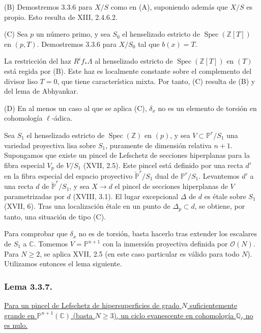\medskip
\noindent\textup{(B)}
Demostremos 3.3.6 para $X/S$ como en (A), suponiendo además que $X/S$
es propio. Esto resulta de XIII, 2.4.6.2.

\medskip
\noindent\textup{(C)}
Sea $p$ un número primo, y sea $S_0$ el henselizado estricto de
$\operatorname{Spec}(\mathbb Z[T])$ en $(p,T)$. Demostremos 3.3.6 para
$X/S_0$ tal que $b(x)=T$.

La restricción del haz $R^if_*\Lambda$ al henselizado estricto de
$\operatorname{Spec}(\mathbb Z[T])$ en $(T)$ está regida por (B). Este
haz es localmente constante sobre el complemento del divisor liso
$T=0$, que tiene característica mixta. Por tanto, (C) resulta de (B) y
del lema de Abhyankar.

\par\medskip
\noindent\textup{(D)}
En al menos un caso al que se aplica (C), $\delta_x$ no es un elemento
de torsión en cohomología $\ell$-ádica.

\pageoriginale

Sea $S_1$ el henselizado estricto de $\operatorname{Spec}(\mathbb Z)$
en $(p)$, y sea $V\subset\mathbb P^r/S_1$ una variedad proyectiva lisa
sobre $S_1$, puramente de dimensión relativa $n+1$. Supongamos que
existe un pincel de Lefschetz de secciones hiperplanas para la fibra
especial $V_p$ de $V/S_1$ (XVII, 2.5). Este pincel está definido por
una recta $d'$ en la fibra especial del espacio proyectivo
$\check{\mathbb P}^{r}/S_1$ dual de
$\mathbb P^r/S_1$. Levantemos $d'$ a una recta $d$ de
$\check{\mathbb P}^{r}/S_1$, y sea $X\to d$ el pincel de secciones
hiperplanas de $V$ parametrizadas por $d$ (XVIII, 3.1). El lugar
excepcional $\Delta$ de $d$ es étale sobre $S_1$ (XVII, 6). Tras una
localización étale en un punto de $\Delta_p\subset d$, se obtiene, por
tanto, una situación de tipo (C).

Para comprobar que $\delta_x$ no es de torsión, basta hacerlo tras
extender los escalares de $S_1$ a $\mathbb C$. Tomemos
$V=\mathbb P^{n+1}$ con la inmersión proyectiva definida por
$\mathcal O(N)$. Para $N\ge2$, se aplica XVII, 2.5 (en este caso
particular es válido para todo $N$). Utilizamos entonces el lema
siguiente.

\subsubsection*{Lema 3.3.7.}
\underline{Para un pincel de Lefschetz de hipersuperficies de grado
$N$ suficientemente grande en $\mathbb P^{n+1}(\mathbb C)$ (basta
$N\ge3$), un ciclo evanescente en cohomología $\mathbb Q_\ell$ no es
nulo.}

